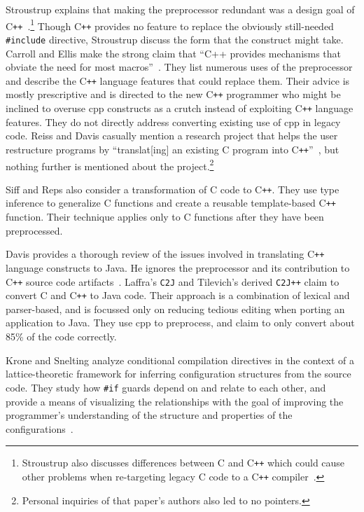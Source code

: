 \documentclass{article}
\newcommand{\Cpp}{\mbox{\textsf{cpp}}}
\newcommand{\CPP}{\mbox{C\texttt{++}}}
\newcommand{\C}{\mbox{C}}
\newcommand{\ppd}[1]{\texttt{\##1}}
\begin{document}
Stroustrup explains that making the preprocessor redundant was a design
goal of \CPP{}~\cite[p.~424]{Stroustrup94}.\footnote{Stroustrup also
  discusses differences between \C{} and \CPP{} which could cause other
  problems when re-targeting legacy \C{} code to a \CPP{}
  compiler~\cite[p.~816-820]{Stroustrup97}.} Though \CPP{} provides no
feature to replace the obviously still-needed \ppd{include} directive,
Stroustrup discuss the form that the construct might take.  Carroll and
Ellis make the strong claim that ``C++ provides mechanisms that obviate
the need for most macros''~\cite[p.~147]{Carroll95}.  They list numerous
uses of the preprocessor and describe the \CPP{} language features that
could replace them.  Their advice is mostly prescriptive and is directed
to the new \CPP{} programmer who might be inclined to overuse \Cpp{}
constructs as a crutch instead of exploiting \CPP{} language features.
They do not directly address converting existing use of \Cpp{} in legacy
code.  Reiss and Davis casually mention a research project that helps
the user restructure programs by ``translat[ing] an existing \C{}
program into \CPP{}''~\cite[p.~2]{Reiss95}, but nothing further is
mentioned about the project.\footnote{Personal inquiries of that paper's
  authors also led to no pointers.}

Siff and Reps also consider a transformation of \C{} code to \CPP{}.
They use type inference to generalize \C{} functions and create a
reusable template-based \CPP{} function.  Their technique applies only
to  \C{} functions after they have been preprocessed.

Davis provides a thorough review of the issues involved in translating
\CPP{} language constructs to Java.  He ignores the preprocessor and its
contribution to \CPP{} source code artifacts~\cite{Davis97}.  Laffra's
\texttt{C2J} and Tilevich's derived \texttt{C2J++} claim to convert \C{} and
\CPP{} to Java code.  Their approach is a combination of lexical and
parser-based, and is focussed only on reducing tedious editing when
porting an application to Java.  They use \Cpp{} to preprocess, and
claim to only convert about 85\% of the code correctly.

Krone and Snelting analyze conditional compilation directives in the
context of a lattice-theoretic framework for inferring configuration
structures from the source code.  They study how \ppd{if}
guards depend on and relate to each other, and provide a means of
visualizing the relationships with the goal of improving the
programmer's understanding of the structure and properties of the
configurations~\cite{Krone94}.
\end{document}
